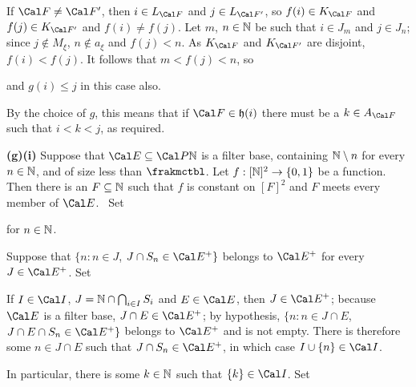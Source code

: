 {\medskip

 If $\Cal F\ne\Cal F'$, then $i\in L_{\Cal F}$ and
$j\in L_{\Cal F'}$, so $f(i)\in K_{\Cal F}$ and $f(j)\in K_{\Cal F'}$ and
$f(i)\ne f(j)$.   Let $m$, $n\in\Bbb N$ be such that $i\in J_m$ and
$j\in J_n$;  since $j\notin M_{\xi}$,
$n\notin a_{\xi}$ and $f(j)<n$.   As $K_{\Cal F}$ and
$K_{\Cal F'}$ are disjoint, $f(i)<f(j)$.   It follows that $m<f(j)<n$, so


\noindent and $g(i)\le j$ in this case also.\ \Qed

By the choice of $g$,
this means that if $\Cal F\in\frak h(i)$ there must be a
$k\in A_{\Cal F}$ such that $i<k<j$, as required.

\medskip

{\bf (g)(i)} Suppose that $\Cal E\subseteq\Cal P\Bbb N$ is a filter base,
containing $\Bbb N\setminus n$ for every $n\in\Bbb N$, and of size less
than $\frakmctbl$.   Let $f:[\Bbb N]^2\to\{0,1\}$ be a function.
Then there is an $F\subseteq\Bbb N$ such that $f$ is constant on $[F]^2$
and $F$ meets every member of $\Cal E$.   \Prf\ Set




\noindent for $n\in\Bbb N$.

\medskip

 Suppose that $\{n:n\in J$, $J\cap S_n\in\Cal E^+\}$
belongs to $\Cal E^+$ for every $J\in\Cal E^+$.   Set


\noindent
If $I\in\Cal I$, $J=\Bbb N\cap\bigcap_{i\in I}S_i$ and $E\in\Cal E$, then
$J\in\Cal E^+$;  because $\Cal E$ is a filter base, $J\cap E\in\Cal E^+$;
by hypothesis, $\{n:n\in J\cap E$, $J\cap E\cap S_n\in\Cal E^+\}$ belongs
to $\Cal E^+$ and is not empty.   There is therefore some $n\in J\cap E$
such that $J\cap S_n\in\Cal E^+$, in which case
$I\cup\{n\}\in\Cal I$.

In particular, there is some $k\in\Bbb N$ such that $\{k\}\in\Cal I$.   Set

}
